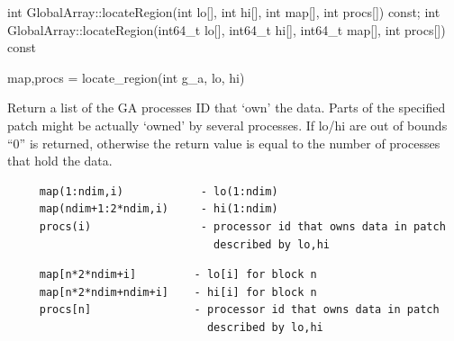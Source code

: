\documentclass[12pt]{article}
\begin{document}
\begin{cxxapi}
\begin{cxxcode}
int GlobalArray::locateRegion(int lo[], int hi[], int map[], int procs[]) const;
int GlobalArray::locateRegion(int64_t lo[], int64_t hi[], int64_t map[], int procs[]) const
\end{cxxcode}
\begin{funcargs}
\end{funcargs}
\end{cxxapi}

\begin{pyapi}
\begin{pycode}
map,procs = locate_region(int g_a, lo, hi)
\end{pycode}
\begin{funcargs}
\end{funcargs}
\end{pyapi}

\local

\begin{desc}

Return a list of the GA processes ID that `own' the data. Parts of the
specified patch might be actually `owned' by several processes. If lo/hi are
out of bounds ``0'' is returned, otherwise the return value is equal to the
number of processes that hold the data.
\end{desc}

\begin{fdesc}
\begin{verbatim}
     map(1:ndim,i)            - lo(1:ndim)
     map(ndim+1:2*ndim,i)     - hi(1:ndim)
     procs(i)                 - processor id that owns data in patch
                                described by lo,hi
\end{verbatim}
\end{fdesc}

\begin{cdesc}
\begin{verbatim}
     map[n*2*ndim+i]         - lo[i] for block n
     map[n*2*ndim+ndim+i]    - hi[i] for block n
     procs[n]                - processor id that owns data in patch
                               described by lo,hi
\end{verbatim}
\end{cdesc}
\end{document}
